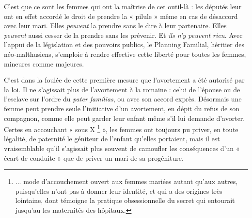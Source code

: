  C'est que ce sont les femmes qui ont la maîtrise de cet outil-là : les députés leur ont en effet accordé le droit de prendre la « pilule » même en cas de désaccord avec leur mari. Elles \emph{peuvent} la prendre sans le dire à leur partenaire. Elles \emph{peuvent} aussi cesser de la prendre sans les prévenir. Et\emph{ ils n'y peuvent rien}. Avec l'appui de la législation et des pouvoirs publics, le Planning Familial, héritier des néo-malthusiens, s'emploie à rendre effective cette liberté pour toutes les femmes, mineures comme majeures. 

 C'est dans la foulée de cette première mesure que l'avortement a été autorisé par la loi. Il ne s'agissait plus de l'avortement à la romaine : celui de l'épouse ou de l'esclave sur l'ordre du \emph{pater familias}, ou avec son accord exprès. Désormais une femme peut prendre seule l'initiative d'un avortement, en dépit du refus de son compagnon, comme elle peut garder leur enfant même s'il lui demande d'avorter. Certes en accouchant « sous X%
\footnote{... mode d'accouchement ouvert aux femmes mariées autant qu'aux autres, puisqu'elles n'ont pas à donner leur identité, et qui a des origines très lointaine, dont témoigne la pratique obsessionnelle du secret qui entourait jusqu'au  les maternités des hôpitaux.}
 », les femmes ont toujours pu priver, en toute légalité, de paternité le géniteur de l'enfant qu'elles portaient, mais il est vraisemblable qu'il s'agissait plus souvent de camoufler les conséquences d'un « écart de conduite » que de priver un mari de sa progéniture.


